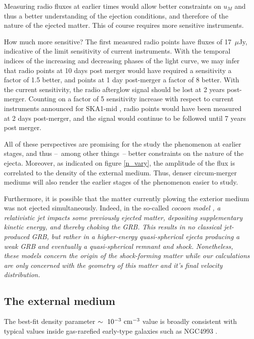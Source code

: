 Measuring radio fluxes at earlier times would allow better constraints on $u_M$ and thus a better understanding of the ejection conditions, and therefore of the nature of the ejected matter. This of course requires more sensitive instruments.

How much more sensitive? The first measured radio points have fluxes of 17~$\mu$Jy, indicative of the limit sensitivity of current instruments. With the temporal indices of the increasing and decreasing phases of the light curve, we may infer that radio points at 10 days post merger would have required a sensitivity a factor of 1.5 better, and points at 1 day post-merger a factor of 8 better. With the current sensitivity, the radio afterglow signal should be lost at 2 years post-merger. Counting on a factor of 5 sensitivity increase with respect to current instruments announced for SKA1-mid \citep{62}, radio points would have been measured at 2 days post-merger, and the signal would continue to be followed until 7 years post merger.

All of these perspectives are promising for the study the phenomenon at earlier stages, and thus --~among other things~-- better constraints on the nature of the ejecta. Moreover, as indicated on figure \ref{n_vary}, the amplitude of the flux is correlated to the density of the external medium. Thus, denser circum-merger mediums will also render the earlier stages of the phenomenon easier to study.

Furthermore, it is possible that the matter currently plowing the exterior medium was not ejected simultaneously. Indeed, in the so-called \it{cocoon model} \citep{42, 5}, a relativistic jet impacts some previously ejected matter, depositing supplementary kinetic energy, and thereby \it{choking} the GRB. This results in no classical jet-produced GRB, but rather in a higher-energy quasi-spherical ejecta producing a weak GRB and eventually a quasi-spherical remnant and shock. Nonetheless, these models concern the origin of the shock-forming matter while our calculations are only concerned with the geometry of this matter and it's final velocity distribution.


\subsection{The external medium}
The best-fit density parameter $\sim~10^{-3}~\rm{cm}^{-3}$ value is broadly consistent with typical values inside gas-rarefied early-type galaxies such as NGC4993 \citep[e.g][]{44}.

